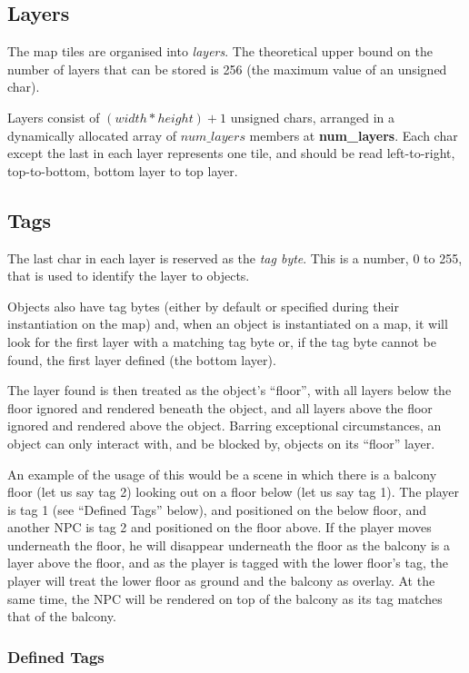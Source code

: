 \documentclass [12pt,a4paper]{article}
\begin{document}
\subsection{Layers}

The map tiles are organised into \emph{layers}.  The theoretical upper
bound on the number of layers that can be stored is 256 (the maximum
value of an unsigned char).

Layers consist of $(width * height) + 1$ unsigned chars, arranged in a
dynamically allocated array of $num\_layers$ members at
\textbf{num\_layers}.  Each char except the last in each layer
represents one tile, and should be read left-to-right, top-to-bottom,
bottom layer to top layer.

\subsection{Tags}

The last char in each layer is reserved as the \emph{tag byte}.  This
is a number, 0 to 255, that is used to identify the layer to
objects.

Objects also have tag bytes (either by default or specified during
their instantiation on the map) and, when an object is instantiated on
a map, it will look for the first layer with a matching tag byte or,
if the tag byte cannot be found, the first layer defined (the bottom
layer).

The layer found is then treated as the object's ``floor'', with all
layers below the floor ignored and rendered beneath the object, and
all layers above the floor ignored and rendered above the object.
Barring exceptional circumstances, an object can only interact with,
and be blocked by, objects on its ``floor'' layer.

An example of the usage of this would be a scene in which there is a
balcony floor (let us say tag 2) looking out on a floor below (let us
say tag 1).  The player is tag 1 (see ``Defined Tags'' below), and
positioned on the below floor, and another NPC is tag 2 and positioned
on the floor above.  If the player moves underneath the floor, he will
disappear underneath the floor as the balcony is a layer above the
floor, and as the player is tagged with the lower floor's tag, the
player will treat the lower floor as ground and the balcony as
overlay.  At the same time, the NPC will be rendered on top of the
balcony as its tag matches that of the balcony.

\subsubsection{Defined Tags}
\end{document}
